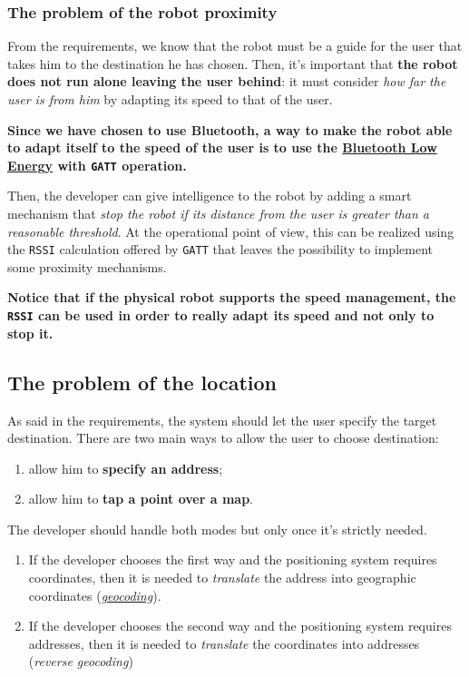 \subsubsection{The problem of the robot proximity}

From the requirements, we know that the robot must be a guide for the user that takes him to the destination he has chosen. Then, it's important that \textbf{the robot does not run alone leaving the user behind}: it must consider \textit{how far the user is from him} by adapting its speed to that of the user.

\begin{tcolorbox}
	\begin{center}
		\textbf{Since we have chosen to use Bluetooth, a way to make the robot able to adapt itself to the speed of the user is to use the \href{https://en.wikipedia.org/wiki/Bluetooth_Low_Energy\#GATT_operations}{Bluetooth Low Energy} with \texttt{GATT} operation.}
	\end{center}
\end{tcolorbox}

Then, the developer can give intelligence to the robot by adding a smart mechanism that \textit{stop the robot if its distance from the user is greater than a reasonable threshold}.
At the operational point of view, this can be realized using the \texttt{RSSI} calculation offered by \texttt{GATT} that leaves the possibility to implement some proximity mechanisms.

\textbf{Notice that if the physical robot supports the speed management, the \texttt{RSSI} can be used in order to really adapt its speed and not only to stop it.}

\subsection{The problem of the location}

As said in the requirements, the system should let the user specify the target destination.
There are two main ways to allow the user to choose destination:
\begin{enumerate}
	\item allow him to \textbf{specify an address};
	\item allow him to\textbf{ tap a point over a map}.
\end{enumerate}

The developer should handle both modes but only once it's strictly needed.
\begin{enumerate}
	\item If the developer chooses the first way and the positioning system requires coordinates, then it is needed to \textit{translate} the address into geographic coordinates (\href{https://developers.google.com/maps/documentation/geocoding/overview}{\textit{geocoding}}).
	
	\item If the developer chooses the second way and the positioning system requires addresses, then it is needed to \textit{translate} the coordinates into addresses (\textit{reverse geocoding})
\end{enumerate}


